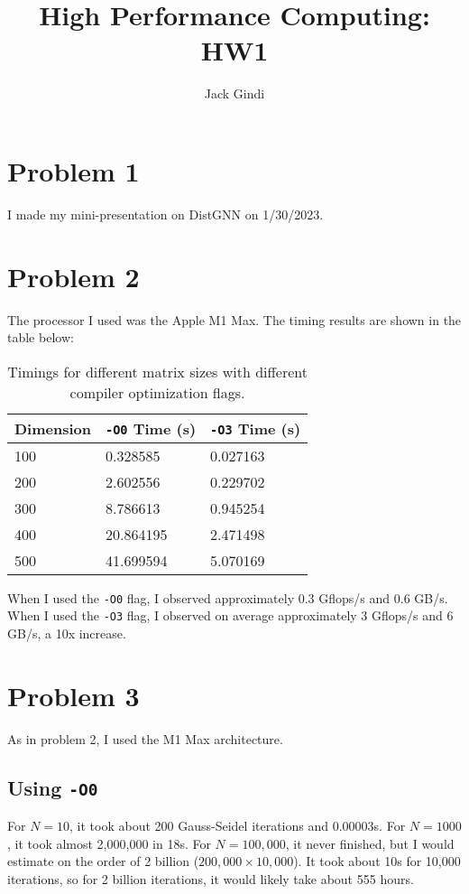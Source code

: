 \documentclass[11pt]{article}
\title{High Performance Computing: HW1}
\author{Jack Gindi}
\begin{document}
\maketitle

\section*{Problem 1}
I made my mini-presentation on DistGNN on 1/30/2023.

\section*{Problem 2}
The processor I used was the Apple M1 Max. The timing results are shown in the table below:
\begin{table}[h]
    \centering
    \begin{tabular}{|l|l|l|}
    \hline
    \textbf{Dimension} & \textbf{\texttt{-O0} Time (s)} & \textbf{\texttt{-O3} Time (s)} \\ \hline
    100                & 0.328585              & 0.027163              \\ \hline
    200                & 2.602556              & 0.229702              \\ \hline
    300                & 8.786613              & 0.945254              \\ \hline
    400                & 20.864195             & 2.471498              \\ \hline
    500                & 41.699594             & 5.070169              \\ \hline
    \end{tabular}
    \caption{Timings for different matrix sizes with different compiler optimization flags.}
\end{table}

When I used the \texttt{-O0} flag, I observed approximately 0.3 Gflops/s and 0.6 GB/s. When
I used the \texttt{-O3} flag, I observed on average approximately 3 Gflops/s and 6 GB/s, a 10x increase.

\section*{Problem 3}
As in problem 2, I used the M1 Max architecture.

\subsection*{Using \texttt{-O0}}
For $N = 10$, it took about 200 Gauss-Seidel iterations and 0.00003s. For $N = 1000$, it took
almost 2,000,000 in 18s. For $N = 100,000$, it never finished, but I would estimate on
the order of 2 billion ($200,000 \times 10,000$). It took about 10s for 10,000 iterations, so for 2 billion iterations, it would likely take about 555 hours.
\end{document}

